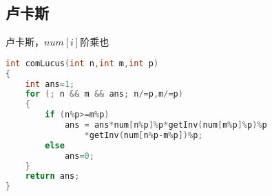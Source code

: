\subsection{卢卡斯}
	卢卡斯，$num[i]$阶乘也
	\begin{lstlisting}[language=c++]
int comLucus(int n,int m,int p)
{
	int ans=1;
	for (; n && m && ans; n/=p,m/=p)
	{
		if (n%p>=m%p)
			ans = ans*num[n%p]%p*getInv(num[m%p]%p)%p
				*getInv(num[n%p-m%p])%p;
		else
			ans=0;
	}
	return ans;
}
	\end{lstlisting}
